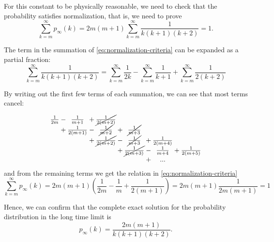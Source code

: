 For this constant to be physically reasonable, we need to check that the probability satisfies normalization, that is, we need to prove
\begin{equation}
	\sum_{k=m}^\infty p_{\infty}(k) = 2m(m+1)\sum_{k=m}^\infty \frac{1}{k(k+1)(k+2)} = 1. 
	\label{eq:normalization-criteria}
\end{equation}

The term in the summation of \autoref{eq:normalization-criteria} can be expanded as a partial fraction:
\begin{equation}
	\sum_{k=m}^\infty \frac{1}{k(k+1)(k+2)} = \sum_{k=m}^\infty \frac{1}{2k} - \sum_{k=m}^\infty \frac{1}{k+1} + \sum_{k=m}^\infty \frac{1}{2(k+2)}
	\label{eq:partial-fractions}
\end{equation}

By writing out the first few terms of each summation, we can see that most terms cancel:

\begin{equation}
\setlength{\arraycolsep}{0pt}%
\newcolumntype{B}{>{{}}c<{{}}}
\begin{array}{ B l B l B l B l B l B}
	\frac{1}{2m} & {}-{} &\frac{1}{m+1} & {}+{} & \cancel{\frac{1}{2(m+2)}} & \\
	& {}+{} & \frac{1}{2(m+1)} & {}-{} &\cancel{\frac{1}{m+2}} & {}+{} &\cancel{\frac{1}{m+3}} \\
	& & & {}+{} & \cancel{\frac{1}{2(m+2)}} & {}-{} & \cancel{\frac{1}{m+3}} & {}+{} &\frac{1}{2(m+4)} \\
	& & & & & {}+{}& \cancel{\frac{1}{2(m+3)}} & {}-{} & \frac{1}{m+4} & {}+{} & \frac{1}{2(m+5)} \\
	& & & & & & & {}+{}& ...\\
\end{array}
\label{eq:summation-cancel}
\end{equation}
and from the remaining terms we get the relation in \autoref{eq:normalization-criteria}
\begin{equation}
	 \sum_{k=m}^\infty p_{\infty}(k) = 2m(m+1)\left ( \frac{1}{2m} - \frac{1}{m} + \frac{1}{2(m+1)} \right ) = 2m(m+1) \frac{1}{2m(m+1)} = 1
	 \label{eq:normalization-satisfied}
\end{equation}

Hence, we can confirm that the complete exact solution for the probability distribution in the long time limit is 
\begin{equation}
	p_{\infty}(k) = \frac{2m(m+1)}{k(k+1)(k+2)}.
	\label{eq:p-infinity-solution}
\end{equation}


